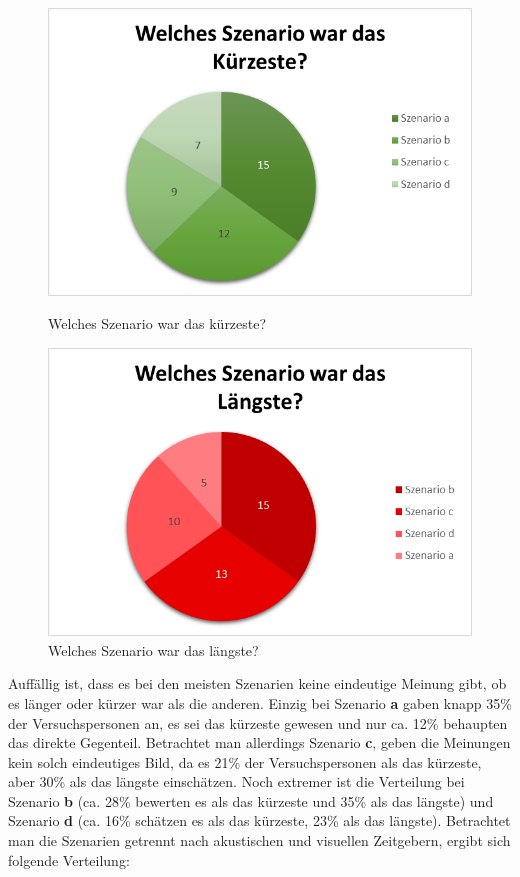 \documentclass{Paper}
\begin{document}
\begin{figure}[H]
\begin{minipage}[t]{0.49\linewidth}
	\includegraphics[scale=0.7]{../Diagramme/einschaetzung/kuerzestes.png}
	\caption{Welches Szenario war das kürzeste?}
	\label{SzenarienKurz}
\end{minipage}
\hfill
\begin{minipage}[t]{0.49\linewidth}
	\includegraphics[scale=0.7]{../Diagramme/einschaetzung/laengstes.png}
	\caption{Welches Szenario war das längste?}
	\label{SzenarienLang}
\end{minipage}
\end{figure}

Auffällig ist, dass es bei den meisten Szenarien keine eindeutige Meinung gibt, ob es länger oder kürzer war als die anderen. Einzig bei Szenario \textbf{a} gaben knapp 35\% der Versuchspersonen an, es sei das kürzeste gewesen und nur ca. 12\% behaupten das direkte Gegenteil. 
Betrachtet man allerdings Szenario \textbf{c}, geben die Meinungen kein solch eindeutiges Bild, da es 21\% der Versuchspersonen als das kürzeste, aber 30\% als das längste einschätzen.  Noch extremer ist die Verteilung bei Szenario \textbf{b} (ca. 28\% bewerten es als das kürzeste und 35\% als das längste) und Szenario \textbf{d}  (ca. 16\%  schätzen es als das kürzeste, 23\% als das längste). Betrachtet man die Szenarien getrennt nach akustischen und visuellen Zeitgebern, ergibt sich folgende Verteilung:
\end{document}
